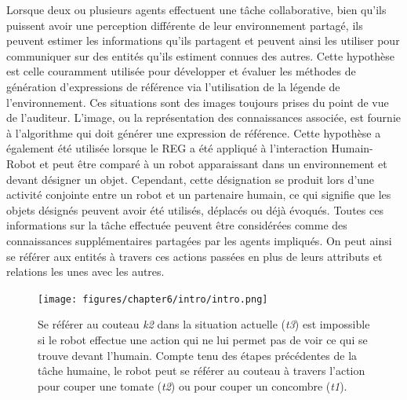 Lorsque deux ou plusieurs agents effectuent une tâche collaborative, bien qu'ils puissent avoir une perception différente de leur environnement partagé, ils peuvent estimer les informations qu'ils partagent et peuvent ainsi les utiliser pour communiquer sur des entités qu'ils estiment connues des autres. Cette hypothèse est celle couramment utilisée pour développer et évaluer les méthodes de génération d'expressions de référence via l'utilisation de la légende de l'environnement\cite{duboue_2015_evaluating}. Ces situations sont des images toujours prises du point de vue de l'auditeur. L'image, ou la représentation des connaissances associée, est fournie à l'algorithme qui doit générer une expression de référence. Cette hypothèse a également été utilisée lorsque le REG a été appliqué à l'interaction Humain-Robot et peut être comparé à un robot apparaissant dans un environnement et devant désigner un objet. Cependant, cette désignation se produit lors d'une activité conjointe entre un robot et un partenaire humain, ce qui signifie que les objets désignés peuvent avoir été utilisés, déplacés ou déjà évoqués. Toutes ces informations sur la tâche effectuée peuvent être considérées comme des connaissances supplémentaires partagées par les agents impliqués. On peut ainsi se référer aux entités à travers ces actions passées en plus de leurs attributs et relations les unes avec les autres.

\begin{figure}[ht!]
\centering
\texttt{[image: figures/chapter6/intro/intro.png]}
\caption{\label{fig:annex_chap6_intro} Se référer au couteau \textit{k2} dans la situation actuelle (\textit{t3}) est impossible si le robot effectue une action qui ne lui permet pas de voir ce qui se trouve devant l'humain. Compte tenu des étapes précédentes de la tâche humaine, le robot peut se référer au couteau à travers l'action pour couper une tomate (\textit{t2}) ou pour couper un concombre (\textit{t1}).}
\end{figure}

